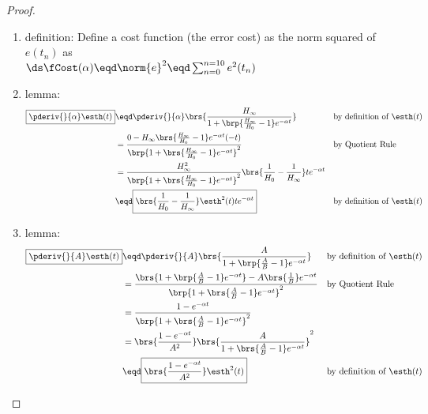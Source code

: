 \begin{proof}
\begin{enumerate}
  \item definition: \label{idef:plant_cost} Define a cost function (the error cost) as the 
        norm squared of $e(t_n)$ as 
        \\\indentx$\ds \fCost(\alpha )\eqd\norm{e}^2\eqd\sum_{n=0}^{n=10}e^2(t_n)$

  \item lemma:\label{ilem:plant1}
    \begin{align*}
      \boxed{\pderiv{}{\alpha }\esth(t)}
        &\eqd \pderiv{}{\alpha }\brs{\frac{H_{\infty}}{1+\brp{\frac{H_{\infty}}{H_0}-1}e^{-\alpha t}}}
        && \text{by definition of $\esth(t)$}
      \\&= \frac{0-H_{\infty}\brs{\frac{H_{\infty}}{H_0}-1}e^{-\alpha t}(-t)}{\brp{1+\brs{\frac{H_{\infty}}{H_0}-1}e^{-\alpha t}}^2}
        && \text{by Quotient Rule}
      \\&= \frac{H_{\infty}^2}{\brp{1+\brs{\frac{H_{\infty}}{H_0}-1}e^{-\alpha t}}^2}
      \brs{\frac{1}{H_0}-\frac{1}{H_{\infty}}}te^{-\alpha t}
      \\&\eqd \boxed{\brs{\frac{1}{H_0}-\frac{1}{H_{\infty}}}\esth^2(t)te^{-\alpha t}}
      && \text{by definition of $\esth(t)$}
    \end{align*}

  \item lemma:\label{ilem:plant2}
    \begin{align*}
      \boxed{\pderiv{}{A}\esth(t)}
        &\eqd \pderiv{}{A }\brs{\frac{A}{1+\brp{\frac{A}{B}-1}e^{-\alpha t}}}
        && \text{by definition of $\esth(t)$}
      \\&= \frac{\brs{1+\brp{\frac{A}{B}-1}e^{-\alpha t}} - A\brs{\frac{1}{B}}e^{-\alpha t}}
                {\brp{1+\brs{\frac{A}{B}-1}e^{-\alpha t}}^2}
        && \text{by Quotient Rule}
      \\&= \frac{1 - e^{-\alpha t}}
                {\brp{1 + \brs{\frac{A}{B}-1}e^{-\alpha t}}^2}
      \\&= \brs{\frac{1 - e^{-\alpha t}} {A^2}}
           \brs{\frac{A}                 {1 + \brs{\frac{A}{B}-1}e^{-\alpha t}}}^2
      \\&\eqd \boxed{\brs{\frac{1 - e^{-\alpha t}}{A^2}} \esth^2(t)}
        && \text{by definition of $\esth(t)$}
    \end{align*}


\end{enumerate}
\end{proof}
